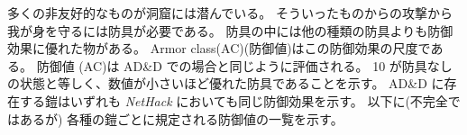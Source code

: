 多くの非友好的なものが洞窟には潜んでいる。
そういったものからの攻撃から我が身を守るには防具が必要である。
防具の中には他の種類の防具よりも防御効果に優れた物がある。
Armor class(AC)(防御値)はこの防御効果の尺度である。
防御値 (AC)は AD\&D での場合と同じように評価される。
10 が防具なしの状態と等しく、数値が小さいほど優れた防具であることを示す。
AD\&D に存在する鎧はいずれも {\it NetHack\/} においても同じ防御効果を示す。
以下に(不完全ではあるが) 各種の鎧ごとに規定される防御値の一覧を示す。

